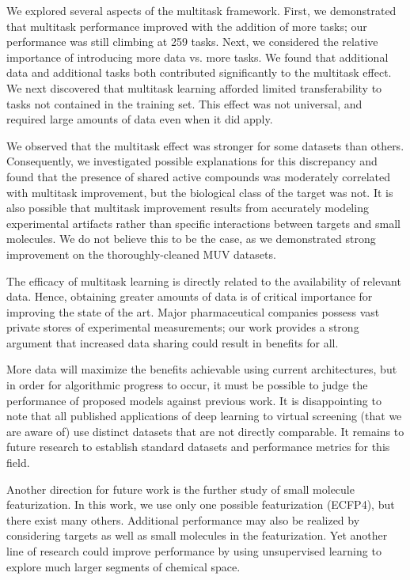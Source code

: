 We explored several aspects of the multitask framework. First, we
demonstrated that multitask performance improved with the addition of more
tasks; our performance was still climbing at 259 tasks. Next, we considered
the relative importance of introducing more data vs. more tasks. We found
that additional data and additional tasks both contributed significantly to
the multitask effect. We next discovered that multitask learning afforded
limited transferability to tasks not contained in the training set. This
effect was not universal, and required large amounts of data even when it
did apply.

We observed that the multitask effect was stronger for some datasets than
others. Consequently, we investigated possible explanations for this
discrepancy and found that the presence of shared active compounds was
moderately correlated with multitask improvement, but the biological class
of the target was not. It is also possible that multitask improvement
results from accurately modeling experimental artifacts rather than
specific interactions between targets and small molecules. We do not
believe this to be the case, as we demonstrated strong improvement on the
thoroughly-cleaned MUV datasets.

The efficacy of multitask learning is directly related to the availability
of relevant data. Hence, obtaining greater amounts of data is of critical
importance for improving the state of the art. Major pharmaceutical
companies possess vast private stores of experimental measurements; our
work provides a strong argument that increased data sharing could result in
benefits for all.

More data will maximize the benefits achievable using current
architectures, but in order for algorithmic progress to occur, it must be
possible to judge the performance of proposed models against previous work.
It is disappointing to note that all published applications of deep
learning to virtual screening (that we are aware of) use distinct datasets
that are not directly comparable. It remains to future research to
establish standard datasets and performance metrics for this field.

Another direction for future work is the further study of small molecule
featurization. In this work, we use only one possible featurization
(ECFP4), but there exist many others. Additional performance may also be
realized by considering targets as well as small molecules in the
featurization. Yet another line of research could improve performance by
using unsupervised learning to explore much larger segments of chemical
space.

